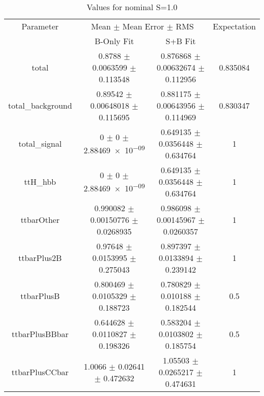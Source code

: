 \begin{table}
\centering
\caption{Values for nominal S=1.0}
\begin{tabular}{cccc}
\toprule
Parameter & \multicolumn{2}{c}{Mean $\pm$ Mean Error $\pm$ RMS} & Expectation\\
 & B-Only Fit & S+B Fit & \\
\midrule
total & \num{0.8788} $\pm$ \num{0.0063599} $\pm$ \num{0.113548} & \num{0.876868} $\pm$ \num{0.00632674} $\pm$ \num{0.112956} & \num{0.835084}\\
total\_background & \num{0.89542} $\pm$ \num{0.00648018} $\pm$ \num{0.115695} & \num{0.881175} $\pm$ \num{0.00643956} $\pm$ \num{0.114969} & \num{0.830347}\\
total\_signal & \num{0} $\pm$ \num{0} $\pm$ \num{2.88469e-09} & \num{0.649135} $\pm$ \num{0.0356448} $\pm$ \num{0.634764} & \num{1}\\
ttH\_hbb & \num{0} $\pm$ \num{0} $\pm$ \num{2.88469e-09} & \num{0.649135} $\pm$ \num{0.0356448} $\pm$ \num{0.634764} & \num{1}\\
ttbarOther & \num{0.990082} $\pm$ \num{0.00150776} $\pm$ \num{0.0268935} & \num{0.986098} $\pm$ \num{0.00145967} $\pm$ \num{0.0260357} & \num{1}\\
ttbarPlus2B & \num{0.97648} $\pm$ \num{0.0153995} $\pm$ \num{0.275043} & \num{0.897397} $\pm$ \num{0.0133894} $\pm$ \num{0.239142} & \num{1}\\
ttbarPlusB & \num{0.800469} $\pm$ \num{0.0105329} $\pm$ \num{0.188723} & \num{0.780829} $\pm$ \num{0.010188} $\pm$ \num{0.182544} & \num{0.5}\\
ttbarPlusBBbar & \num{0.644628} $\pm$ \num{0.0110827} $\pm$ \num{0.198326} & \num{0.583204} $\pm$ \num{0.0103802} $\pm$ \num{0.185754} & \num{0.5}\\
ttbarPlusCCbar & \num{1.0066} $\pm$ \num{0.02641} $\pm$ \num{0.472632} & \num{1.05503} $\pm$ \num{0.0265217} $\pm$ \num{0.474631} & \num{1}\\
\bottomrule
\end{tabular}
\end{table}